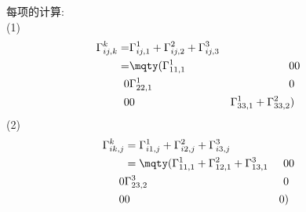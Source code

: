 每项的计算:\\
(1)\\
\begin{align*}
    \Gamma^k_{ij,k} =& \Gamma^1_{ij, 1} + \Gamma^2_{ij, 2} + \Gamma^3_{ij, 3}\\
        =&\mqty(\Gamma^1_{11,1} & 0 & 0 \\ 0 & \Gamma^1_{22,1} & 0 \\ 0 & 0 & \Gamma^1_{33,1} + \Gamma^2_{33,2})\\
\end{align*}
(2)
\begin{align*}
    \Gamma^k_{ik,j} &= \Gamma^1_{i1,j} + \Gamma^2_{i2,j} + \Gamma^3_{i3,j}\\
    &=\mqty(\Gamma^1_{11,1} + \Gamma^2_{12,1} + \Gamma^3_{13,1} & 0 & 0 \\ 0 & \Gamma^3_{23,2} & 0\\ 0 & 0 & 0)
\end{align*}
